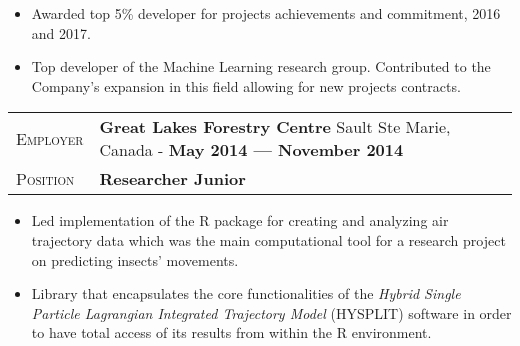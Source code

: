 \documentclass[9pt, a4paper, oneside, final]{scrartcl} %
\newcommand{\gray}{\rowcolor[gray]{.90}} %
\begin{document}
\begin{itemize}\itemsep1.0pt \parskip1.5pt 


\item Awarded top 5\% developer for projects achievements and commitment, 2016 and 2017.


\item Top developer of the Machine Learning research group. Contributed to the Company’s expansion in this field allowing for new projects contracts.


\end{itemize}

\begin{center}
\begin{tabularx}{1.0\linewidth}{>{\raggedleft\scshape}p{2.2cm}X}
\gray Employer & \textbf{Great Lakes Forestry Centre } \hfill Sault Ste Marie, Canada - \textbf{May 2014 --- November 2014}\\
\gray Position & \textbf{Researcher Junior}\\
\end{tabularx}
\end{center}

\begin{itemize}\itemsep1.0pt \parskip1.5pt 

\item Led implementation of the R package for creating and analyzing air trajectory data which was the main computational tool for a research project on predicting insects' movements.

\item Library that encapsulates the core functionalities of the \textit{Hybrid Single Particle Lagrangian Integrated Trajectory Model} (HYSPLIT) software in order to have total access of its results from within the R environment.

\end{itemize}
\end{document}
